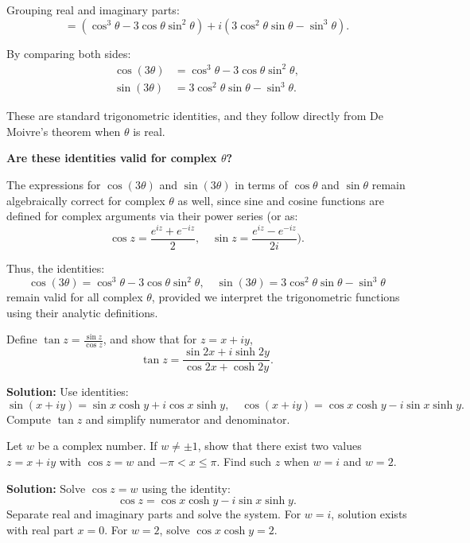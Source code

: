 Grouping real and imaginary parts:
\[
= \left( \cos^3 \theta - 3 \cos \theta \sin^2 \theta \right)
+ i \left( 3 \cos^2 \theta \sin \theta - \sin^3 \theta \right).
\]

By comparing both sides:
\begin{align*}
\cos(3\theta) &= \cos^3 \theta - 3 \cos \theta \sin^2 \theta, \\
\sin(3\theta) &= 3 \cos^2 \theta \sin \theta - \sin^3 \theta.
\end{align*}

These are standard trigonometric identities, and they follow directly from De Moivre’s theorem when \( \theta \) is real.

\vspace{0.5em}
\textbf{Are these identities valid for complex \( \theta \)?}

The expressions for \( \cos(3\theta) \) and \( \sin(3\theta) \) in terms of \( \cos \theta \) and \( \sin \theta \) remain algebraically correct for complex \( \theta \) as well, since sine and cosine functions are defined for complex arguments via their power series (or as:
\[
\cos z = \frac{e^{iz} + e^{-iz}}{2}, \quad \sin z = \frac{e^{iz} - e^{-iz}}{2i}).
\]

Thus, the identities:
\[
\cos(3\theta) = \cos^3 \theta - 3 \cos \theta \sin^2 \theta,
\quad
\sin(3\theta) = 3 \cos^2 \theta \sin \theta - \sin^3 \theta
\]
remain valid for all complex \( \theta \), provided we interpret the trigonometric functions using their analytic definitions.


\begin{problembox}
Define \( \tan z = \frac{\sin z}{\cos z} \), and show that for \( z = x + iy \),
\[
\tan z = \frac{\sin 2x + i \sinh 2y}{\cos 2x + \cosh 2y}.
\]
\end{problembox}

\textbf{Solution:}
Use identities:
\[
\sin(x + iy) = \sin x \cosh y + i \cos x \sinh y, \quad
\cos(x + iy) = \cos x \cosh y - i \sin x \sinh y.
\]
Compute \( \tan z \) and simplify numerator and denominator.

\begin{problembox}
Let \( w \) be a complex number. If \( w \ne \pm 1 \), show that there exist two values \( z = x + iy \) with \( \cos z = w \) and \( -\pi < x \leq \pi \). Find such \( z \) when \( w = i \) and \( w = 2 \).
\end{problembox}

\textbf{Solution:}
Solve \( \cos z = w \) using the identity:
\[
\cos z = \cos x \cosh y - i \sin x \sinh y.
\]
Separate real and imaginary parts and solve the system.  
For \( w = i \), solution exists with real part \( x = 0 \).  
For \( w = 2 \), solve \( \cos x \cosh y = 2 \).



